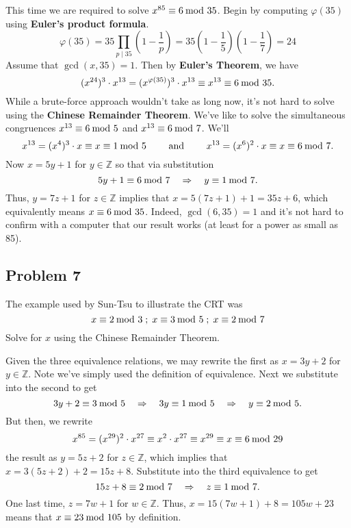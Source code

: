 \documentclass[../hw_sols.tex]{subfiles}
\begin{document}
\begin{solution}

This time we are required to solve $x^{85} \equiv 6 \tmod{35}$. Begin by 
computing $\varphi(35)$ using \textbf{Euler's product formula}.
	$$\varphi(35) 
	= 35 \prod_{p \mid 35} \left( 1 - \frac{1}{p} \right) 
	= 35 \left( 1 - \frac{1}{5} \right) \left( 1 - \frac{1}{7} \right) 
	= 24$$
Assume that $\gcd(x,35) = 1$. Then by \textbf{Euler's Theorem}, we have 
	$$(x^{24})^3 \cdot x^{13}
	 = (x^{\varphi(35)})^3 \cdot x^{13} 
	\equiv x^{13} \equiv 6 \tmod{35}.$$
While a brute-force approach wouldn't take as long now, it's not hard to solve 
using the \textbf{Chinese Remainder Theorem}. We've like to solve the 
simultaneous congruences 
$x^{13} \equiv 6 \tmod{5}$ and $x^{13} \equiv 6 \tmod{7}$. We'll
	$$x^{13} = (x^4)^3 \cdot x \equiv x \equiv 1 \tmod{5} \qquad 
	\text{ and } 
	\qquad x^{13} = (x^6)^2 \cdot x \equiv x \equiv 6 \tmod{7}.$$
Now $x = 5y + 1$ for $y \in \mathbb{Z}$ so that via substitution 
	$$5y + 1 \equiv 6 \tmod{7} 
	\quad \Rightarrow \quad 
	y \equiv 1 \tmod{7}.$$
Thus, $y = 7z + 1$ for $z \in \mathbb{Z}$ implies that 
$x = 5(7z+1) + 1 = 35z + 6$, which equivalently means $x \equiv 6 \tmod{35}$. 
Indeed, $\gcd(6,35) = 1$ and it's not hard to confirm with a computer that 
our result works (at least for a power as small as 85).

\end{solution}


\newpage



\subsection*{Problem 7}

The example used by Sun-Tsu to illustrate the CRT was
	$$x \equiv 2 \tmod{3} \; 
	; \; x \equiv 3 \tmod{5} \; 
	; \; x \equiv 2 \tmod{7}$$
Solve for $x$ using the Chinese Remainder Theorem.

\begin{solution}

Given the three equivalence relations, we may rewrite the first as $x = 3y + 2$ 
for $y \in \mathbb{Z}$. Note we've simply used the definition of equivalence. 
Next we substitute into the second to get 
	$$3y + 2 \equiv 3 \tmod{5} \quad 
	\Rightarrow \quad 3y \equiv 1 \tmod{5} \quad 
	\Rightarrow \quad y \equiv 2 \tmod{5}.$$
But then, we rewrite 
	$$x^{85} = (x^{29})^2 \cdot x^{27} \equiv x^2 \cdot x^{27} 
	\equiv x^{29} \equiv x \equiv 6 \tmod{29}$$
the result as $y = 5z + 2$ for $z \in \mathbb{Z}$, which implies that 
$x = 3(5z + 2) + 2 = 15z + 8$. Substitute into the third equivalence to get 
	$$15z + 8 \equiv 2 \tmod{7} 
	\quad \Rightarrow \quad 
	z \equiv 1 \tmod{7}.$$ 
One last time, $z = 7w + 1$ for $w \in \mathbb{Z}$. Thus, 
$x = 15(7w + 1) + 8 = 105w + 23$ means that $x \equiv 23 \tmod{105}$ by 
definition.

\end{solution}
\end{document}
